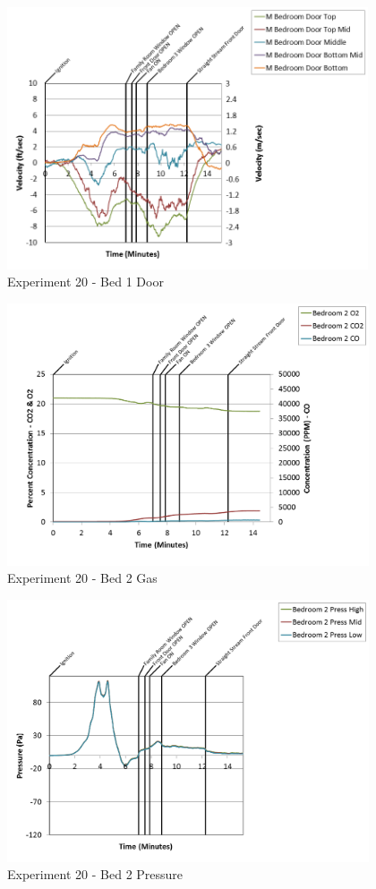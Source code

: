 \documentclass{article}
\begin{document}
\begin{appendices}
\clearpage

\begin{figure}[h!]
	\centering
	\includegraphics[height=3.05in]{0_Images/Results_Charts/Exp_20_Charts/Bed1Door.png}
	\caption{Experiment 20 - Bed 1 Door}
\end{figure}


\begin{figure}[h!]
	\centering
	\includegraphics[height=3.05in]{0_Images/Results_Charts/Exp_20_Charts/Bed2Gas.png}
	\caption{Experiment 20 - Bed 2 Gas}
\end{figure}

\clearpage

\begin{figure}[h!]
	\centering
	\includegraphics[height=3.05in]{0_Images/Results_Charts/Exp_20_Charts/Bed2Pressure.png}
	\caption{Experiment 20 - Bed 2 Pressure}
\end{figure}



\end{appendices}
\end{document}
